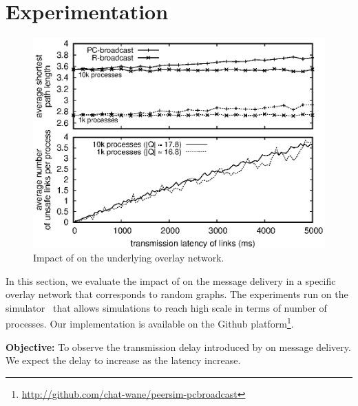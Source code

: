 
\section{Experimentation}
\label{sec:experimentation}


\begin{figure}
  \begin{center}
    \includegraphics[width=1.5\columnwidth]{./img/delay.eps}
    \caption{\label{fig:delay}Impact of \CBROADCAST on the underlying overlay
      network.}
  \end{center}
\end{figure}


In this section, we evaluate the impact of \CBROADCAST on the message delivery
in a specific overlay network that corresponds to random graphs. The experiments
run on the \PEERSIM simulator~\cite{montresor2009peersim} that allows
simulations to reach high scale in terms of number of processes. Our
implementation is available on the Github
platform\footnote{\url{http://github.com/chat-wane/peersim-pcbroadcast}}.


\noindent \textbf{Objective:} To observe the transmission delay introduced by
\CBROADCAST on message delivery. We expect the delay to increase as the latency
increase.

